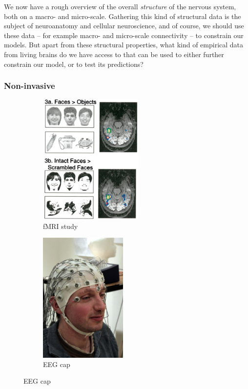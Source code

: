 \documentclass[10pt,letterpaper,oneside]{article}
\begin{document}
We now have a rough overview of the overall \emph{structure} of the nervous system, both on a macro- and micro-scale. Gathering this kind of structural data is the subject of neuroanatomy and cellular neuroscience, and of course, we should use these data -- for example macro- and micro-scale connectivity -- to constrain our models. But apart from these structural properties, what kind of empirical data from living brains do we have access to that can be used to either further constrain our model, or to test its predictions?

\subsubsection{Non-invasive}

\begin{figure}
	\begin{subfigure}[b]{0.33\textwidth}%
		\centering%
		\includegraphics[height=6.5cm]{media/kanwisher_et_al_1997_fusiform_fmri.png}%
		\caption{fMRI study}%
		\label{fig:fmri}
	\end{subfigure}%
	\begin{subfigure}[b]{0.3\textwidth}%
		\centering%
		\includegraphics[height=6.5cm]{media/eeg_recording_cap_small.jpg}%
		\caption{EEG cap}%
		\label{fig:eeg_cap}

\end{subfigure}
\end{figure}
\end{document}
